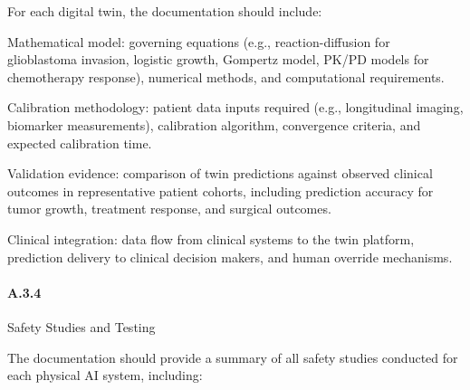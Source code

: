 For each digital twin, the documentation should include:

\begin{description}[leftmargin=2.5cm,style=sameline]

\item[(a)] Mathematical model: governing equations (e.g., reaction-diffusion for glioblastoma invasion, logistic growth, Gompertz model, PK/PD models for chemotherapy response), numerical methods, and computational requirements.

\item[(b)] Calibration methodology: patient data inputs required (e.g., longitudinal imaging, biomarker measurements), calibration algorithm, convergence criteria, and expected calibration time.

\item[(c)] Validation evidence: comparison of twin predictions against observed clinical outcomes in representative patient cohorts, including prediction accuracy for tumor growth, treatment response, and surgical outcomes.

\item[(d)] Clinical integration: data flow from clinical systems to the twin platform, prediction delivery to clinical decision makers, and human override mechanisms.

\end{description}

\paragraph{A.3.4} Safety Studies and Testing

The documentation should provide a summary of all safety studies conducted for each physical AI system, including:

